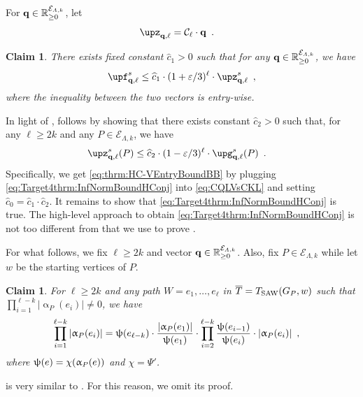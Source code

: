 \documentclass[11pt,reqno]{amsart}
\numberwithin{equation}{section}
\newtheorem{claim}[theorem]{Claim}
\newcommand{\cE}{{\mathcal{E}}}
\newcommand{\applegreen}[1]{ {\color{applegreen}#1}}
\newcommand{\blue}[1]{{\color{blue}#1}}
\newcommand{\bluepigment}[1]{{\color{blue(pigment)}#1}}
\newcommand{\capri}[1]{{\color{capri}#1}}
\newcommand{\darkmagenta}[1]{{\color{darkmagenta}#1}}
\newcommand{\goldenbrown}[1]{{\color{goldenbrown}#1}}
\newcommand{\iris}[1]{{\color{iris}#1}}
\newcommand{\ExtV}{\iris{\cE}}
\newcommand{\potF}{{\Psi}}
\newcommand{\xdpotF}{\chi}
\newcommand{\pfs}{\darkmagenta{s}}
\newcommand{\Tsaw}{T_{\rm SAW}}
\newcommand{\abs}[1]{\blue{|}#1\blue{|}}
\renewcommand{\applegreen}[1]{#1}
\renewcommand{\blue}[1]{#1}
\renewcommand{\bluepigment}[1]{#1}
\renewcommand{\capri}[1]{#1}
\renewcommand{\darkmagenta}[1]{#1}
\renewcommand{\goldenbrown}[1]{#1}
\renewcommand{\iris}[1]{#1}
\newcommand{\ke}{\blue{e}}
\newcommand{\ki}{\capri{i}}
\newcommand{\kk}{\bluepigment{k}}
\newcommand{\kell}{{\color{green(pigment)}\ell}}%
\newcommand{\kP}{\goldenbrown{P}}
\newcommand{\kW}{\blue{W}}
\newcommand{\kw}{\blue{w}}
\renewcommand{\ke}{e}
\renewcommand{\ki}{i}
\renewcommand{\kk}{k}
\renewcommand{\kell}{\ell}
\renewcommand{\kP}{P}
\renewcommand{\kW}{W}
\renewcommand{\kw}{w}
\newcommand{\infweight}{\upalpha}
\begin{document}
For $\vtest \in \mathbb{R}^{\ExtV_{\Lambda,\kk}}_{\geq 0}$, let
\begin{align}\label{eq:DefOfZQELL}
\SimpleFvec_{\vtest,\kell} &= \SimpleExtdInfMatrixL_{\kell} \cdot \vtest \enspace. 
\end{align}

\begin{claim}\label{claim:CQLVsCKL}
There exists fixed constant $\widehat{c}_1>0$ such that 
for any $\vtest \in \mathbb{R}^{\ExtV_{\Lambda,\kk}}_{\geq 0}$, we have
\begin{align}\label{eq:CQLVsCKL}
\vecF^{\pfs}_{\vtest, \kell} \leq \widehat{c}_1\cdot (1+\varepsilon/3)^{\kell} \cdot \SimpleFvec^{\pfs}_{\vtest,\kell} \enspace,
\end{align}
where the inequality between the two vectors is entry-wise.
\end{claim}

In light of ,  follows by showing that there exists constant 
$\widehat{c}_2>0$ such that, for any $\kell\geq 2\kk$ and any $\kP\in \ExtV_{\Lambda,\kk}$,  we have 
\begin{align}\label{eq:Target4thrm:InfNormBoundHConj}
 \SimpleFvec^{\pfs}_{\vtest,\kell}(\kP) &\leq \widehat{c}_2 \cdot (1-\varepsilon/3)^{\kell} \cdot \vecG^{\pfs}_{\vtest, \kell}(\kP)
% 
\enspace.
\end{align}
% 
Specifically, we get \eqref{eq:thrm:HC-VEntryBoundBB} by plugging \eqref{eq:Target4thrm:InfNormBoundHConj} into 
 \eqref{eq:CQLVsCKL} and setting $\widehat{c}_0=\widehat{c}_1\cdot \widehat{c}_2$.
% 
It remains to show that \eqref{eq:Target4thrm:InfNormBoundHConj} is true. 
%
The high-level approach to obtain \eqref{eq:Target4thrm:InfNormBoundHConj} 
is not too different from that we use to prove .



For what follows, we fix $\kell\geq 2\kk$ and vector $\vtest\in \mathbb{R}^{\ExtV_{\Lambda,\kk}}_{\geq 0}$. Also, fix  $\kP \in \ExtV_{\Lambda,\kk}$
while let $\kw$ be the starting vertices of $\kP$.  



\begin{claim}\label{claim:AddPotential}
For $\kell\geq 2\kk$ and any path $\kW=\ke_1, \ldots, \ke_{\kell}$  in $\TPP=\Tsaw(\gext{G}{\kP}, \kw)$ such that 
$\prod^{\kell-\kk}_{\ki=1} \abs{\infweight_{\kP}(\ke_{\ki})} \neq 0$, 
we have
\begin{align} \nonumber
\prod^{\kell-\kk}_{\ki=1} \abs{\infweight_{\kP}(\ke_{\ki})} &=\chiofh(\ke_{\kell-\kk}) \cdot \frac{\abs{\infweight_{\kP}(\ke_1)}}{\chiofh(\ke_1)} 
%
\cdot \prod^{\kell-\kk}_{\ki=2}\frac{\chiofh(\ke_{\ki-1})}{\chiofh(\ke_{\ki})} \cdot \abs{\infweight_{\kP}(\ke_{\ki})} 
\enspace, 
\end{align}
where $\chiofh(\ke)=\xdpotF(\infweight_{\kP}(\ke))$ and $\xdpotF=\potF'$. 
\end{claim} 
 is very similar to  . For this reason, we omit its proof. 
\end{document}
